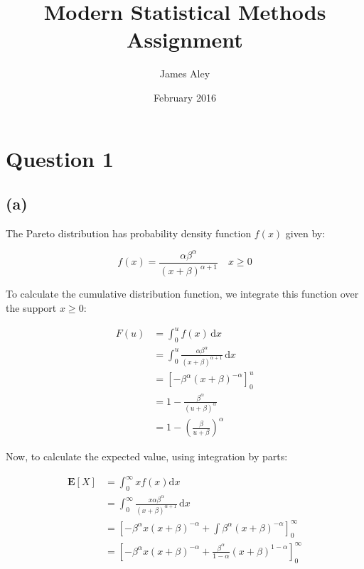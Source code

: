 \documentclass{article}
\title{Modern Statistical Methods Assignment}
\author{James Aley}
\date{February 2016}
\begin{document}
\maketitle

\section*{Question 1}

\subsection*{(a)}

The Pareto distribution has probability density function $f(x)$ given by:

\begin{displaymath}
  f(x) = \frac{\alpha \beta^{\alpha}}{{(x + \beta)}^{\alpha + 1}} \quad x \geq 0
\end{displaymath}

To calculate the cumulative distribution function, we integrate this
function over the support \(x \geq 0\):


\begin{align*}
  F(u) &= \int_0^u f(x) \, \mathrm{d}x \\
       &= \int_0^u \frac{\alpha \beta^{\alpha}}
                            {{(x + \beta)}^{\alpha + 1}}
         \, \mathrm{d}x \\
       &= {\left[ - \beta^\alpha {(x + \beta)}^{-\alpha}  \right]}_0^u \\
       &= 1 - \frac{\beta^{\alpha}}{{(u + \beta)}^\alpha} \\
       &= 1 - {\left( \frac{\beta}{u + \beta} \right)}^{\alpha}
\end{align*}

Now, to calculate the expected value, using integration by parts:

\begin{align*}
  \mathbf{E}\left[X\right] &= \int_0^{\infty} x f(x) \mathrm{d}x \\
                           &= \int_0^{\infty} \frac{x \alpha \beta^{\alpha}}
                             {{(x + \beta)}^{\alpha + 1}}
                             \, \mathrm{d}x \\
                           &= {\left[
                             - \beta^\alpha x {(x + \beta)}^{-\alpha}
                             + \int \beta^{\alpha} {(x + \beta)}^{- \alpha}
                             \right]}_0^{\infty} \\
                           &= {\left[
                             - \beta^\alpha x {(x + \beta)}^{-\alpha}
                             + \frac{\beta^{\alpha}}{1 - \alpha}
                             {\left( x + \beta \right)}^{1 - \alpha}
                             \right]}_0^{\infty} \\
\end{align*}
\end{document}

